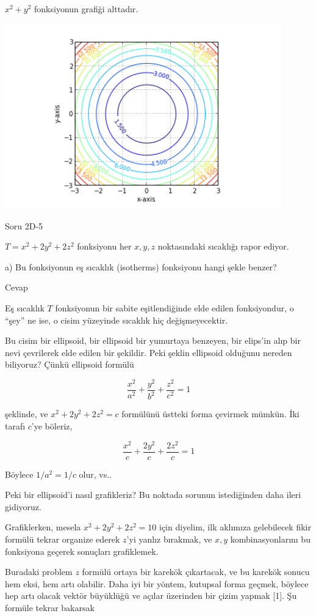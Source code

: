 \documentclass[12pt,fleqn]{article}\usepackage{../../common}
\begin{document}
$x^2+y^2$ fonksiyonun grafiği alttadır. 

\includegraphics[height=8cm]{levels.png}

Soru 2D-5

$T = x^2 + 2y^2 + 2z^2$ fonksiyonu her $x,y,z$ noktasındaki sıcaklığı rapor
ediyor. 

a) Bu fonksiyonun eş sıcaklık (isotherms) fonksiyonu hangi şekle benzer?

Cevap 

Eş sıcaklık $T$ fonksiyonun bir sabite eşitlendiğinde elde edilen
fonksiyondur, o ``şey'' ne ise, o cisim yüzeyinde sıcaklık hiç
değişmeyecektir. 

Bu cisim bir ellipsoid, bir ellipsoid bir yumurtaya benzeyen, bir elips'in
alıp bir nevi çevrilerek elde edilen bir şekildir. Peki şeklin ellipsoid
olduğunu nereden biliyoruz? Çünkü ellipsoid formülü

$$ \frac{x^2}{a^2} +  \frac{y^2}{b^2} + \frac{z^2}{c^2}  = 1  $$

şeklinde, ve $x^2 + 2y^2 + 2z^2 = c$ formülünü üstteki forma çevirmek
mümkün. İki tarafı $c$'ye böleriz,

$$ \frac{x^2}{c} +  \frac{2y^2}{c} + \frac{2z^2}{c}  = 1  $$

Böylece $1/a^2 = 1/c$ olur, vs.. 

Peki bir ellipsoid'i nasıl grafikleriz? Bu noktada sorunun istediğinden
daha ileri gidiyoruz. 

Grafiklerken, mesela $x^2 + 2y^2 + 2z^2 = 10$ için diyelim, ilk aklımıza
gelebilecek fikir formülü tekrar organize ederek $z$'yi yanlız bırakmak, ve
$x,y$ kombinasyonlarını bu fonksiyona geçerek sonuçları grafiklemek. 

Buradaki problem $z$ formülü ortaya bir karekök çıkartacak, ve bu karekök
sonucu hem eksi, hem artı olabilir. Daha iyi bir yöntem, kutupsal forma
geçmek, böylece hep artı olacak vektör büyüklüğü ve açılar üzerinden bir
çizim yapmak [1]. Şu formüle tekrar bakarsak
\end{document}
